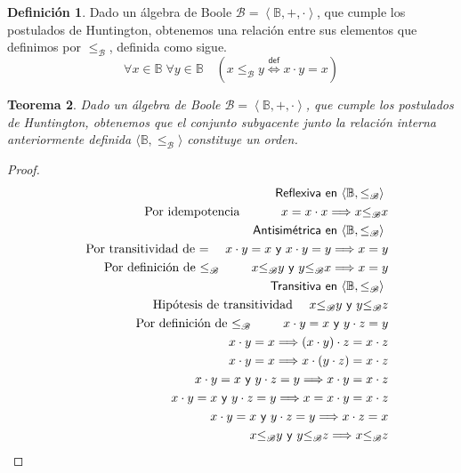 \documentclass[final,12pt,a4paper,twoside,fleqn]{extbook}
\newcommand{\sthen}{\ensuremath{\Longrightarrow}}
\newcommand{\logicdef}{\ensuremath{
        \stackrel
            {\mathsf{def}}
            {\Longleftrightarrow}
}}
\newcommand{\then}{\ensuremath{\sthen}}
\newcommand{\setB}{\ensuremath{\mathbb{B}}}
\newcommand{\algB}{\ensuremath{\mathscr{B}}}
\newcommand{\leqB}{\ensuremath{{\leq}_{\algB}}}
\newtheorem{thm}{Teorema}[chapter]
\theoremstyle{definition}
\newtheorem{defn}[thm]{Definición}
\theoremstyle{remark}
\begin{document}
\begin{defn}
Dado un álgebra de Boole \(\algB = \left\langle \setB, +, \cdot
\right\rangle\), que cumple los postulados de Huntington, obtenemos una
relación entre sus elementos que definimos por \(\leqB\), definida
como sigue.
\begin{equation}
\forall x \in \setB \; \forall y \in \setB \quad \left( x \leqB y \logicdef x 
\cdot y = x \right)
\end{equation}
\end{defn}



\begin{thm}
Dado un álgebra de Boole \(\algB = \left\langle \setB, +, \cdot
\right\rangle\), que cumple los postulados de Huntington, obtenemos que el
conjunto subyacente junto la relación interna anteriormente definida
\(\langle\setB,\leqB\rangle\) constituye un orden.
\end{thm}



\begin{proof}
\begin{eqnarray}
\nonumber
&&\textsf{Reflexiva en \(\langle\setB,\leqB\rangle\)  }\\
&&\text{Por idempotencia }\qquad\quad x = x \cdot x \then x \leqB x\\
&&\textsf{Antisimétrica en \(\langle \setB , \leqB \rangle\)  }\\
&&\text{Por transitividad  de \(=\) } \quad x \cdot y = x \textsf{ y } x
\cdot y = y \then x = y\\
&&\text{Por definición de \( \leqB \) } \;\qquad x \leqB y
\textsf{ y } y \leqB x \then x = y\\
&&\textsf{Transitiva en \( \langle \setB, \leqB \rangle \)  }\\
&&\text{Hipótesis de transitividad } \quad x \leqB y \textsf{ y } y
\leqB z\\
&&\text{Por definición de \( \leqB \) } \;\qquad x \cdot y = x \textsf{
y } y \cdot z = y\\
&&\qquad\;\qquad x \cdot y = x \then (x \cdot y) \cdot z = x \cdot z\\
&&\qquad\;\qquad x \cdot y = x \then x \cdot (y \cdot z) = x \cdot z\\
&&\qquad\;\qquad x \cdot y = x \textsf{ y } y \cdot z = y \then x \cdot y = x
\cdot z\\
&&\qquad\;\qquad x \cdot y = x \textsf{ y } y \cdot z = y \then x = x \cdot y
= x \cdot z\\
&&\qquad\;\qquad x \cdot y = x \textsf{ y } y \cdot z = y \then x \cdot z =
x\\
&&\qquad\;\qquad x \leqB y \textsf{ y } y \leqB z \then x
\leqB z
\end{eqnarray}
\end{proof}
\end{document}

